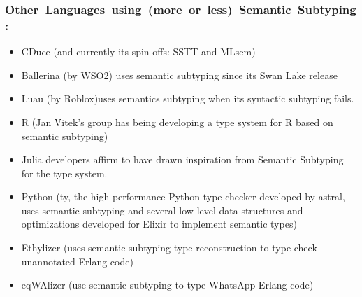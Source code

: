 \begin{frame}[fragile]
\frametitle{\mbox{Other Languages using (more or less) Semantic Subtyping:}}
\begin{itemize}\setlength{\itemsep}{0pt}
    \item CDuce (and currently its spin offs: SSTT and MLsem)
    \item Ballerina (by WSO2) uses semantic subtyping since its Swan Lake release
    \item Luau (by Roblox)uses semantics subtyping when its syntactic subtyping fails.
    \item R (Jan Vitek's group has being developing a type system for R based on semantic subtyping)
    \item Julia developers affirm to have drawn inspiration from Semantic Subtyping for the type system.
    \item Python (\textsf{ty}, the high-performance Python type checker developed by astral, uses semantic subtyping and several low-level data-structures and optimizations developed for Elixir to implement semantic types) 
    \item Ethylizer (uses semantic subtyping type reconstruction to type-check unannotated Erlang code)
    \item eqWAlizer (use semantic subtyping to type WhatsApp Erlang code)
\end{itemize}
\end{frame}

